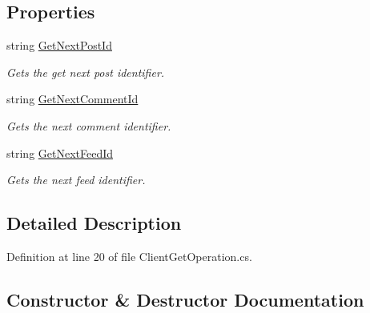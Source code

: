 \subsection*{Properties}
\begin{DoxyCompactItemize}
\item 
string \hyperlink{class_operations_1_1_client_operations_1_1_client_get_operations_a19be48989b7a11c85e9c4a1e6e38f26a}{Get\+Next\+Post\+Id}
\begin{DoxyCompactList}\small\item\em Gets the get next post identifier. \end{DoxyCompactList}\item 
string \hyperlink{class_operations_1_1_client_operations_1_1_client_get_operations_ad6c8a8843f9039915ee5c47d6ca5536b}{Get\+Next\+Comment\+Id}
\begin{DoxyCompactList}\small\item\em Gets the next comment identifier. \end{DoxyCompactList}\item 
string \hyperlink{class_operations_1_1_client_operations_1_1_client_get_operations_aec911a8916000179440a1e4df7dc9ad7}{Get\+Next\+Feed\+Id}
\begin{DoxyCompactList}\small\item\em Gets the next feed identifier. \end{DoxyCompactList}\end{DoxyCompactItemize}


\subsection{Detailed Description}


Definition at line 20 of file Client\+Get\+Operation.\+cs.



\subsection{Constructor \& Destructor Documentation}
